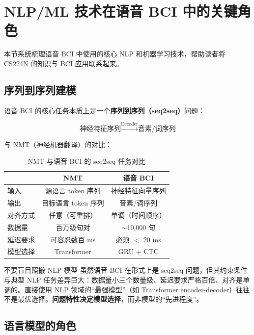 \documentclass[a4paper]{article}
\begin{document}

\section{NLP/ML 技术在语音 BCI 中的关键角色}

本节系统梳理语音 BCI 中使用的核心 NLP 和机器学习技术，帮助读者将 CS224N 的知识与 BCI 应用联系起来。

\subsection{序列到序列建模}

语音 BCI 的核心任务本质上是一个\textbf{序列到序列（seq2seq）}问题：

$$\text{神经特征序列} \xrightarrow{\text{Decoder}} \text{音素/词序列}$$

与 NMT（神经机器翻译）的对比：

\begin{table}[H]
\centering
\begin{tabular}{lcc}
\toprule
& \textbf{NMT} & \textbf{语音 BCI} \\
\midrule
输入 & 源语言 token 序列 & 神经特征向量序列 \\
输出 & 目标语言 token 序列 & 音素/词序列 \\
对齐方式 & 任意（可重排） & 单调（时间顺序） \\
数据量 & 百万级句对 & $\sim$10,000 句 \\
延迟要求 & 可容忍数百 ms & 必须 $<$ 20 ms \\
模型选择 & Transformer & GRU + CTC \\
\bottomrule
\end{tabular}
\caption{NMT 与语音 BCI 的 seq2seq 任务对比}
\end{table}

\begin{warningbox}{不要盲目照搬 NLP 模型}
虽然语音 BCI 在形式上是 seq2seq 问题，但其约束条件与典型 NLP 任务差异巨大：数据量小三个数量级、延迟要求严格百倍、对齐是单调的。直接使用 NLP 领域的``最强模型''（如 Transformer encoder-decoder）往往不是最优选择。\textbf{问题特性决定模型选择}，而非模型的``先进程度''。
\end{warningbox}

\subsection{语言模型的角色}
\end{document}
